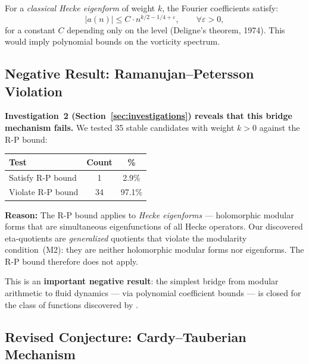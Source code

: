 \begin{proposition}
\label{prop:spectral_bound}
For a \emph{classical Hecke eigenform} of weight $k$, the Fourier coefficients satisfy:
\begin{equation}
  |a(n)| \leq C \cdot n^{k/2 - 1/4 + \varepsilon}, \qquad \forall \varepsilon > 0,
\end{equation}
for a constant $C$ depending only on the level (Deligne's theorem, 1974). This would imply polynomial bounds on the vorticity spectrum.
\end{proposition}

\subsection{Negative Result: Ramanujan--Petersson Violation}

\textbf{Investigation~2 (Section~\ref{sec:investigations}) reveals that this bridge mechanism fails.} We tested 35 stable candidates with weight $k > 0$ against the R-P bound:

\begin{center}
\begin{tabular}{lcc}
\toprule
\textbf{Test} & \textbf{Count} & \textbf{\%} \\
\midrule
Satisfy R-P bound & 1 & 2.9\% \\
Violate R-P bound & 34 & 97.1\% \\
\bottomrule
\end{tabular}
\end{center}

\textbf{Reason:} The R-P bound applies to \emph{Hecke eigenforms} --- holomorphic modular forms that are simultaneous eigenfunctions of all Hecke operators. Our discovered eta-quotients are \emph{generalized} quotients that violate the modularity condition~(M2): they are neither holomorphic modular forms nor eigenforms. The R-P bound therefore does not apply.

This is an \textbf{important negative result}: the simplest bridge from modular arithmetic to fluid dynamics --- via polynomial coefficient bounds --- is closed for the class of functions discovered by \RAMA{}.

\subsection{Revised Conjecture: Cardy--Tauberian Mechanism}

